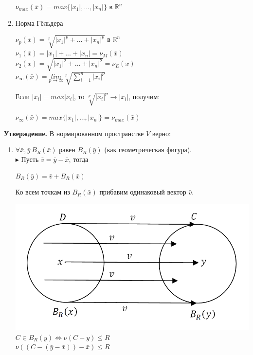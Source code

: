 \documentclass[a4paper,12pt]{article}
\begin{document}
\begin{defintion}
\begin{enumerate}
	\begin{center}
		$\nu_{max}(\bar x) = max\{|x_1|,...,|x_n|\}$ в $\mathbb{R}^n$\\\end{center}
	\item Норма Гёльдера
	\begin{center}$\nu_p(\bar x) = \sqrt[p]{|x_1|^p+...+|x_n|^p}$ в $\mathbb{R}^n$\\
		$\nu_1(\bar x) = |x_1|+...+|x_n| = \nu_M(\bar x)$\\ 
		$\nu_2(\bar x) = \sqrt{|x_1|^2+...+|x_n|^2} = \nu_E(\bar x)$\\
		$\nu_{\infty}(\bar x) = \underset{p \to \infty}{lim}\sqrt[p]{\sum\limits_{i=1}^n |x_i|^p}$\end{center}
	Если $|x_i| = max |x_i|$, то $\sqrt[p]{|x_i|^p} \to |x_i|$, получим:
	\begin{center}$\nu_{\infty}(\bar x) = max \{|x_1|,...,|x_n|\} = \nu_{max}(\bar x)$\end{center}
\end{enumerate}
\textbf{Утверждение.}
В нормированном пространстве $V$ верно:\begin{enumerate}
	\item $\forall \bar x, \bar y ~B_R(\bar x)$ равен $B_R(\bar y)$ (как геометрическая фигура).\\ 
	$\blacktriangleright$ Пусть $\bar v = \bar y - \bar x$, тогда \begin{center} $B_R(\bar y) = \bar v + B_R(\bar x)$\end{center}
	Ко всем точкам из $B_R(\bar x)$ прибавим одинаковый вектор $\bar v$.\begin{center}
		\includegraphics[scale=0.5]{l4_9.png}\\
		$C \in B_R(y) \Leftrightarrow \nu(C-y) \leqslant R$\\
		$\nu((C-(\bar y - \bar x))-\bar x) \leqslant R$\end{center}

\end{enumerate}
\end{defintion}
\end{document}
